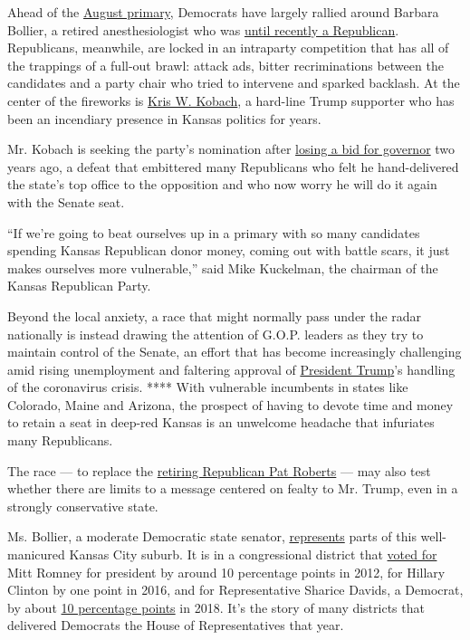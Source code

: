 Ahead of the
\href{https://www.nytimes3xbfgragh.onion/2020/08/04/us/elections/primary-election-michigan-arizona-kansas.html}{August
primary}, Democrats have largely rallied around Barbara Bollier, a
retired anesthesiologist who was
\href{https://www.kansas.com/news/politics-government/article222990385.html}{until
recently a Republican}. Republicans, meanwhile, are locked in an
intraparty competition that has all of the trappings of a full-out
brawl: attack ads, bitter recriminations between the candidates and a
party chair who tried to intervene and sparked backlash. At the center
of the fireworks is
\href{https://www.nytimes3xbfgragh.onion/2020/08/03/us/politics/kris-kobach-kansas-senate-primary.html}{Kris
W. Kobach}, a hard-line Trump supporter who has been an incendiary
presence in Kansas politics for years.

Mr. Kobach is seeking the party's nomination after
\href{https://www.nytimes3xbfgragh.onion/2018/11/06/us/laura-kelly-wins-kansas-governors-race.html}{losing
a bid for governor} two years ago, a defeat that embittered many
Republicans who felt he hand-delivered the state's top office to the
opposition and who now worry he will do it again with the Senate seat.

``If we're going to beat ourselves up in a primary with so many
candidates spending Kansas Republican donor money, coming out with
battle scars, it just makes ourselves more vulnerable,'' said Mike
Kuckelman, the chairman of the Kansas Republican Party.

Beyond the local anxiety, a race that might normally pass under the
radar nationally is instead drawing the attention of G.O.P. leaders as
they try to maintain control of the Senate, an effort that has become
increasingly challenging amid rising unemployment and faltering approval
of
\href{https://www.nytimes3xbfgragh.onion/interactive/2020/us/elections/donald-trump.html}{President
Trump}'s handling of the coronavirus crisis. **** With vulnerable
incumbents in states like Colorado, Maine and Arizona, the prospect of
having to devote time and money to retain a seat in deep-red Kansas is
an unwelcome headache that infuriates many Republicans.

The race --- to replace the
\href{https://www.nytimes3xbfgragh.onion/2019/01/04/us/politics/roberts-kansas-senate.html}{retiring
Republican Pat Roberts} --- may also test whether there are limits to a
message centered on fealty to Mr. Trump, even in a strongly conservative
state.

Ms. Bollier, a moderate Democratic state senator,
\href{http://www.kslegislature.org/li/m/pdf/district_maps/district_map_s_007.pdf}{represents}
parts of this well-manicured Kansas City suburb. It is in a
congressional district that
\href{https://www.dailykos.com/stories/2012/11/19/1163009/-Daily-Kos-Elections-presidential-results-by-congressional-district-for-the-2012-2008-elections}{voted
for} Mitt Romney for president by around 10 percentage points in 2012,
for Hillary Clinton by one point in 2016, and for Representative Sharice
Davids, a Democrat, by about
\href{https://www.politico.com/election-results/2018/kansas/}{10
percentage points} in 2018. It's the story of many districts that
delivered Democrats the House of Representatives that year.

